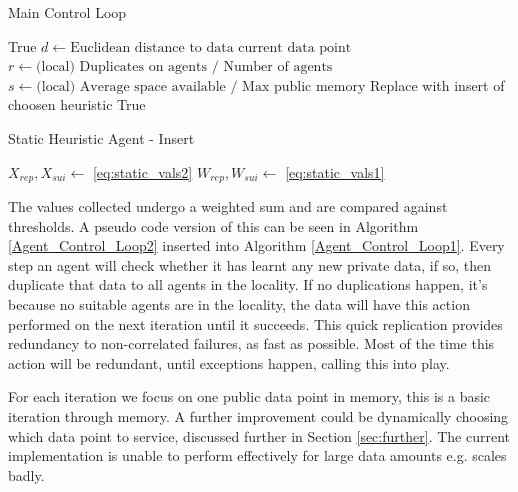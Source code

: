\documentclass{UoYCSproject}
\begin{document}
\begin{algorithm}
\caption{Main Control Loop}
\label{Agent_Control_Loop1}
\begin{algorithmic}[1]
\State {}
\State
{}
\State {}
\State \Return True
\EndIf
\State
\State $d \gets \text{Euclidean distance to data current data point}$
\State $r \gets \text{(local) Duplicates on agents / Number of agents}$
\State $s \gets \text{(local) Average space available / Max public memory}$
\State
\State Replace with insert of choosen heuristic
\State
{}
\State {}
\EndIf
\State
{}
\State {}
\EndIf
\State
\State {}
\State
\State \Return True
\EndProcedure
\end{algorithmic}
\end{algorithm}

\begin{algorithm}
\caption{Static Heuristic Agent - Insert}
\label{Agent_Control_Loop2}
\begin{algorithmic}[1]
\State $X_{rep}, X_{sui} \gets $ \ref{eq:static_vals2}
\State $W_{rep}, W_{sui} \gets $ \ref{eq:static_vals1}
\end{algorithmic}
\end{algorithm}

The values collected undergo a weighted sum and are compared against thresholds.
A pseudo code version of this can be seen in Algorithm \ref{Agent_Control_Loop2} inserted into Algorithm \ref{Agent_Control_Loop1}.
Every step an agent will check whether it has learnt any new private data, if so, then duplicate that data to all agents in the locality.
If no duplications happen, it’s because no suitable agents are in the locality, the data will have this action performed on the next iteration until it succeeds.
This quick replication provides redundancy to non-correlated failures, as fast as possible.
Most of the time this action will be redundant, until exceptions happen, calling this into play.

For each iteration we focus on one public data point in memory, this is a basic iteration through memory.
A further improvement could be dynamically choosing which data point to service, discussed further in Section \ref{sec:further}.
The current implementation is unable to perform effectively for large data amounts e.g. scales badly.
\end{document}
